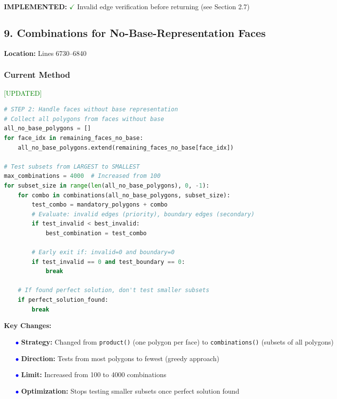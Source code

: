 \documentclass[11pt]{article}
\begin{document}
\textbf{IMPLEMENTED:} \textcolor{green}{$\checkmark$} Invalid edge verification before returning (see Section 2.7)

\subsection{9. Combinations for No-Base-Representation Faces}
\textbf{Location:} Lines 6730--6840

\subsubsection{Current Method} \textcolor{green}{[UPDATED]}
\begin{lstlisting}[language=Python]
# STEP 2: Handle faces without base representation
# Collect all polygons from faces without base
all_no_base_polygons = []
for face_idx in remaining_faces_no_base:
    all_no_base_polygons.extend(remaining_faces_no_base[face_idx])

# Test subsets from LARGEST to SMALLEST
max_combinations = 4000  # Increased from 100
for subset_size in range(len(all_no_base_polygons), 0, -1):
    for combo in combinations(all_no_base_polygons, subset_size):
        test_combo = mandatory_polygons + combo
        # Evaluate: invalid edges (priority), boundary edges (secondary)
        if test_invalid < best_invalid:
            best_combination = test_combo
        
        # Early exit if: invalid=0 and boundary=0
        if test_invalid == 0 and test_boundary == 0:
            break
    
    # If found perfect solution, don't test smaller subsets
    if perfect_solution_found:
        break
\end{lstlisting}

\textbf{Key Changes:}
\begin{itemize}
    \item[\textcolor{blue}{$\bullet$}] \textbf{Strategy:} Changed from \texttt{product()} (one polygon per face) to \texttt{combinations()} (subsets of all polygons)
    \item[\textcolor{blue}{$\bullet$}] \textbf{Direction:} Tests from most polygons to fewest (greedy approach)
    \item[\textcolor{blue}{$\bullet$}] \textbf{Limit:} Increased from 100 to 4000 combinations
    \item[\textcolor{blue}{$\bullet$}] \textbf{Optimization:} Stops testing smaller subsets once perfect solution found
\end{itemize}
\end{document}
